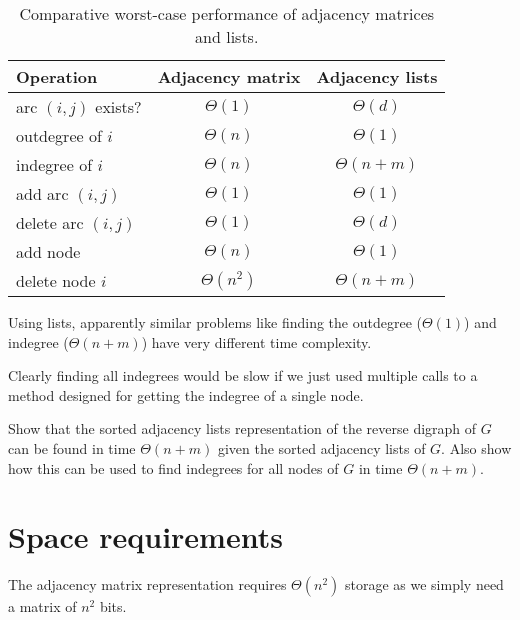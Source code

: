 \begin{table}[H]
\centering
\caption{Comparative worst-case performance of adjacency matrices and lists.}
\label{tbl:basicOpsPerformance}
\begin{tabular}{|l|c|c|}
\hline
\textbf{Operation} 	& \textbf{Adjacency matrix} & \textbf{Adjacency lists} \\
\hline
arc $(i, j)$ exists? & $\Theta(1)$  & $\Theta(d)$ \\
\hline
outdegree  of $i$ 	& $\Theta(n)$ & $\Theta(1)$ \\
\hline
indegree of $i$ 	& $\Theta(n)$ &  $\Theta(n+m)$ \\
\hline
add arc $(i, j)$ 	& $\Theta(1)$ & $\Theta(1)$  \\
\hline
delete arc $(i, j)$ & $\Theta(1)$  & $\Theta(d)$  \\
\hline
add node 			& $\Theta(n)$ & $\Theta(1)$  \\
\hline
delete node $i$ 	& $\Theta(n^2)$  & $\Theta(n+m)$  \\
\hline
\end{tabular}
\end{table}

Using lists, apparently similar problems like finding the outdegree ($\Theta(1)$) and indegree ($\Theta(n+m)$)
have very different time complexity. 

Clearly finding all indegrees would be slow if we just used multiple calls to a method designed for getting the indegree of a single node. 

\begin{Boxample}[8]
Show that the sorted adjacency lists representation of the reverse digraph of $G$ can be found in time $\Theta(n+m)$ 
given the sorted adjacency lists of $G$. Also show how this can be used to find indegrees for all nodes of $G$ in time $\Theta(n+m)$.
\end{Boxample}

\section{Space requirements}
The adjacency matrix representation requires $\Theta(n^2)$ storage 
as we simply need a matrix of $n^2$ bits. 

